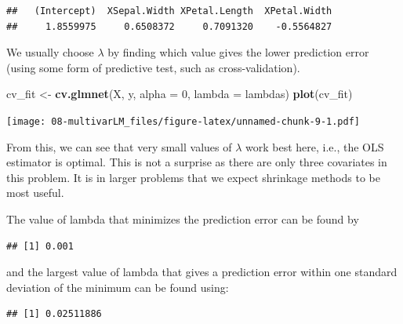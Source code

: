 \documentclass[
]{book}
\newenvironment{Shaded}{\begin{snugshade}}{\end{snugshade}}
\newcommand{\AttributeTok}[1]{\textcolor[rgb]{0.13,0.29,0.53}{#1}}
\newcommand{\DecValTok}[1]{\textcolor[rgb]{0.00,0.00,0.81}{#1}}
\newcommand{\FloatTok}[1]{\textcolor[rgb]{0.00,0.00,0.81}{#1}}
\newcommand{\FunctionTok}[1]{\textcolor[rgb]{0.13,0.29,0.53}{\textbf{#1}}}
\newcommand{\NormalTok}[1]{#1}
\newcommand{\OtherTok}[1]{\textcolor[rgb]{0.56,0.35,0.01}{#1}}
\newcommand{\SpecialCharTok}[1]{\textcolor[rgb]{0.81,0.36,0.00}{\textbf{#1}}}
\theoremstyle{definition}
\theoremstyle{definition}
\theoremstyle{definition}
\theoremstyle{definition}
\theoremstyle{remark}
\begin{document}
\begin{verbatim}
##   (Intercept)  XSepal.Width XPetal.Length  XPetal.Width 
##     1.8559975     0.6508372     0.7091320    -0.5564827
\end{verbatim}

We usually choose \(\lambda\) by finding which value gives the lower prediction error (using some form of predictive test, such as cross-validation).

\begin{Shaded}
\begin{Highlighting}[]
\NormalTok{cv\_fit }\OtherTok{\textless{}{-}} \FunctionTok{cv.glmnet}\NormalTok{(X, y, }\AttributeTok{alpha =} \DecValTok{0}\NormalTok{, }\AttributeTok{lambda =}\NormalTok{ lambdas)}
\FunctionTok{plot}\NormalTok{(cv\_fit)}
\end{Highlighting}
\end{Shaded}

\texttt{[image: 08-multivarLM\_files/figure-latex/unnamed-chunk-9-1.pdf]}

From this, we can see that very small values of \(\lambda\) work best here, i.e., the OLS estimator is optimal. This is not a surprise as there are only three covariates in this problem. It is in larger problems that we expect shrinkage methods to be most useful.

The value of lambda that minimizes the prediction error can be found by

\begin{Shaded}
\end{Shaded}

\begin{verbatim}
## [1] 0.001
\end{verbatim}

and the largest value of lambda that gives a prediction error within one standard deviation of the minimum can be found using:

\begin{Shaded}
\end{Shaded}

\begin{verbatim}
## [1] 0.02511886
\end{verbatim}
\end{document}
